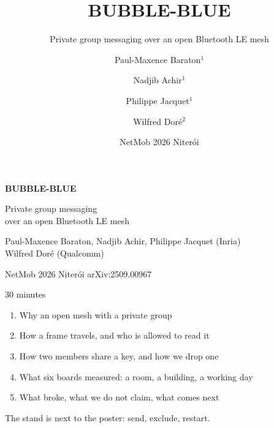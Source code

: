 \documentclass[aspectratio=169,11pt]{beamer}
\title{BUBBLE-BLUE}
\subtitle{Private group messaging over an open Bluetooth LE mesh}
\author{Paul-Maxence Baraton$^1$ \and Nadjib Achir$^1$ \and Philippe Jacquet$^1$ \and Wilfred Doré$^2$}
\institute{$^1$Inria, France \qquad $^2$Qualcomm, France}
\date{NetMob 2026 \textperiodcentered{} Niterói}
\begin{document}
\begin{frame}[plain]
\vspace{8mm}
{\color{white}\bfseries\Huge BUBBLE-BLUE\par}
\vspace{4mm}
{\color{white!85}\Large Private group messaging\\over an open Bluetooth LE mesh\par}
\vspace{10mm}
{\color{white}Paul-Maxence Baraton, Nadjib Achir, Philippe Jacquet \textcolor{white!70}{(Inria)}\\
Wilfred Doré \textcolor{white!70}{(Qualcomm)}\par}
\vspace{6mm}
{\color{white!65}NetMob 2026 \textperiodcentered{} Niterói \qquad arXiv:2509.00967}
\end{frame}

\begin{frame}{30 minutes}
\begin{enumerate}
  \item Why an open mesh with a private group
  \item How a frame travels, and who is allowed to read it
  \item How two members share a key, and how we drop one
  \item What six boards measured: a room, a building, a working day
  \item What broke, what we do not claim, what comes next
\end{enumerate}
\vspace{6mm}
{\color{muted}\small The stand is next to the poster: send, exclude, restart.}
\end{frame}
\end{document}
